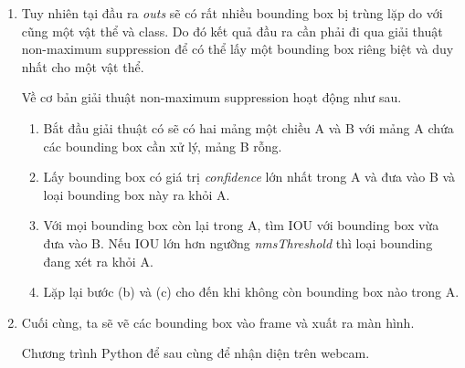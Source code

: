 \begin{enumerate}
	\item Tuy nhiên tại đầu ra \emph{outs} sẽ có rất nhiều bounding box bị trùng lặp do với cũng một vật thể và class. Do đó kết quả đầu ra cần phải đi qua giải thuật non-maximum suppression để có thể lấy một bounding box riêng biệt và duy nhất cho một vật thể.
	
	Về cơ bản giải thuật non-maximum suppression hoạt động như sau.
	\begin{enumerate}
		\item Bắt đầu giải thuật có sẽ có hai mảng một chiều A và B với mảng A chứa các bounding box cần xử lý, mảng B rỗng.
		\item Lấy bounding box có giá trị \emph{confidence} lớn nhất trong A và đưa vào B và loại bounding box này ra khỏi A.
		\item Với mọi bounding box còn lại trong A, tìm IOU với bounding box vừa đưa vào B. Nếu IOU lớn hơn ngưỡng \emph{nmsThreshold} thì loại bounding đang xét ra khỏi A.
		\item Lặp lại bước (b) và (c) cho đến khi không còn bounding box nào trong A.
	\end{enumerate}

\noindent{}

	\item Cuối cùng, ta sẽ vẽ các bounding box vào frame và xuất ra màn hình.

\noindent{}

Chương trình Python để sau cùng để nhận diện trên webcam.


\end{enumerate}
